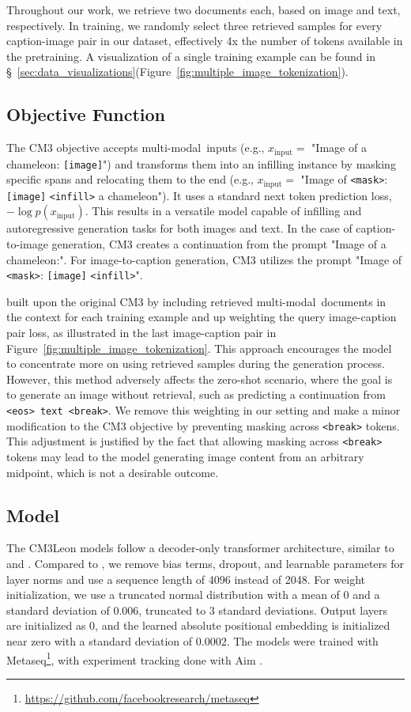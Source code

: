 \documentclass{article}
\newcommand{\model}{CM3Leon}
\newcommand{\mm}{multi-modal}
\begin{document}
Throughout our work, we retrieve two documents each, based on image and text, respectively. In training, we randomly select three retrieved samples for every caption-image pair in our dataset, effectively 4x the number of tokens available in the pretraining. A visualization of a single training example can be found in \S~\ref{sec:data_visualizations}(Figure~\ref{fig:multiple_image_tokenization}).

\subsection{Objective Function}
\label{sec:objective}
The CM3 objective accepts \mm\ inputs (e.g., $x_\text{input}=$ "Image of a chameleon: \texttt{[image]}") and transforms them into an infilling instance by masking specific spans and relocating them to the end (e.g., $x_\text{input}=$ "Image of \texttt{<mask>}: \texttt{[image]} \texttt{<infill>} a chameleon"). It uses a standard next token prediction loss, $-\log p(x_\text{input})$. This results in a versatile model capable of infilling and autoregressive generation tasks for both images and text. In the case of caption-to-image generation, CM3 creates a continuation from the prompt "Image of a chameleon:". For image-to-caption generation, CM3 utilizes the prompt "Image of \texttt{<mask>}: \texttt{[image]} \texttt{<infill>}".

\citet{RA_CM3} built upon the original CM3 by including retrieved \mm\ documents in the context for each training example and up weighting the query image-caption pair loss, as illustrated in the last image-caption pair in Figure~\ref{fig:multiple_image_tokenization}. This approach encourages the model to concentrate more on using retrieved samples during the generation process. However, this method adversely affects the zero-shot scenario, where the goal is to generate an image without retrieval, such as predicting a continuation from \texttt{<eos> text <break>}. We remove this weighting in our setting and make a minor modification to the CM3 objective by preventing masking across \texttt{<break>} tokens. This adjustment is justified by the fact that allowing masking across \texttt{<break>} tokens may lead to the model generating image content from an arbitrary midpoint, which is not a desirable outcome. 

\subsection{Model}
The \model{} models follow a decoder-only transformer architecture, similar to \citet{OPT} and \citet{gpt3}. Compared to \citet{OPT}, we remove bias terms, dropout, and learnable parameters for layer norms and use a sequence length of 4096 instead of 2048. For weight initialization, we use a truncated normal distribution with a mean of 0 and a standard deviation of 0.006, truncated to 3 standard deviations. Output layers are initialized as 0, and the learned absolute positional embedding is initialized near zero with a standard deviation of 0.0002. The models were trained with Metaseq\footnote{\url{https://github.com/facebookresearch/metaseq}}, with experiment tracking done with Aim \citet{AIM}.
\end{document}
